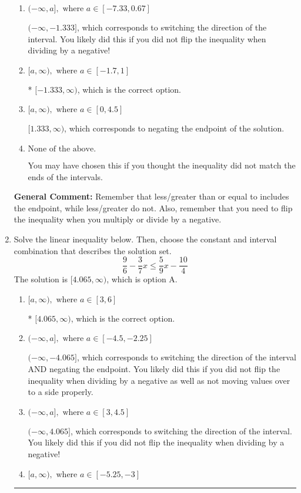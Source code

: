 \documentclass{extbook}[14pt]
\newcommand{\litem}[1]{\item #1

\rule{\textwidth}{0.4pt}}
\begin{document}
\begin{enumerate}
{\begin{enumerate}[label=\Alph*.]
 $(-\infty, 1.333]$, which corresponds to switching the direction of the interval AND negating the endpoint. You likely did this if you did not flip the inequality when dividing by a negative as well as not moving values over to a side properly.
\item \( (-\infty, a], \text{ where } a \in [-7.33, 0.67] \)

 $(-\infty, -1.333]$, which corresponds to switching the direction of the interval. You likely did this if you did not flip the inequality when dividing by a negative!
\item \( [a, \infty), \text{ where } a \in [-1.7, 1] \)

* $[-1.333, \infty)$, which is the correct option.
\item \( [a, \infty), \text{ where } a \in [0, 4.5] \)

 $[1.333, \infty)$, which corresponds to negating the endpoint of the solution.
\item \( \text{None of the above}. \)

You may have chosen this if you thought the inequality did not match the ends of the intervals.
\end{enumerate}

\textbf{General Comment:} Remember that less/greater than or equal to includes the endpoint, while less/greater do not. Also, remember that you need to flip the inequality when you multiply or divide by a negative.
}
\litem{
Solve the linear inequality below. Then, choose the constant and interval combination that describes the solution set.
\[ \frac{9}{6} - \frac{3}{7} x \leq \frac{5}{9} x - \frac{10}{4} \]The solution is \( [4.065, \infty) \), which is option A.\begin{enumerate}[label=\Alph*.]
\item \( [a, \infty), \text{ where } a \in [3, 6] \)

* $[4.065, \infty)$, which is the correct option.
\item \( (-\infty, a], \text{ where } a \in [-4.5, -2.25] \)

 $(-\infty, -4.065]$, which corresponds to switching the direction of the interval AND negating the endpoint. You likely did this if you did not flip the inequality when dividing by a negative as well as not moving values over to a side properly.
\item \( (-\infty, a], \text{ where } a \in [3, 4.5] \)

 $(-\infty, 4.065]$, which corresponds to switching the direction of the interval. You likely did this if you did not flip the inequality when dividing by a negative!
\item \( [a, \infty), \text{ where } a \in [-5.25, -3] \)


\end{enumerate}}
\end{enumerate}
\end{document}

